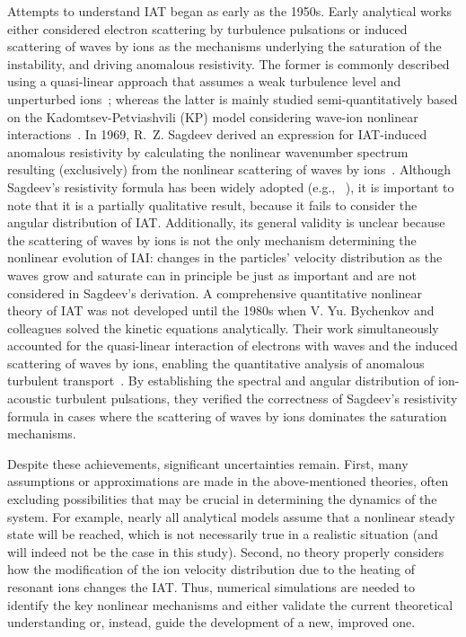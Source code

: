 \documentclass[%
 reprint,
 amsmath,
 amssymb,
 aps,
 prx,
floatfix,
superscriptaddress
]{revtex4-2}
\begin{document}
Attempts to understand IAT began as early as the 1950s.
Early analytical works either considered electron scattering by turbulence pulsations or induced scattering of waves by ions as the mechanisms underlying the saturation of the instability, and driving anomalous resistivity.
The former is commonly described using a quasi-linear approach that assumes a weak turbulence level and unperturbed ions~\cite{rudakov1966quasilinear,kovrizhnykh1966interaction, zavoiski1967turbulant}; whereas the latter is mainly studied semi-quantitatively based on the Kadomtsev-Petviashvili (KP) model considering wave-ion nonlinear interactions~\cite{kadomtsev1962turbulence,petviashvili1963ion}.
In 1969, R.~Z. Sagdeev derived an expression for IAT-induced anomalous resistivity by calculating the nonlinear wavenumber spectrum resulting (exclusively) from the nonlinear scattering of waves by ions~\cite{Sagdeev1967, sagdeev1969nonlinear}. 
Although Sagdeev's resistivity formula has been widely adopted (e.g., ~\cite{uzdensky2003petschek}), it is important to note that it is a partially qualitative result, because it fails to consider the angular distribution of IAT.
Additionally, its general validity is unclear because the scattering of waves by ions is not the only mechanism determining the nonlinear evolution of IAI:
changes in the particles' velocity distribution as the waves grow and saturate can in principle be just as important and are not considered in Sagdeev's derivation.
A comprehensive quantitative nonlinear theory of IAT was not developed until the 1980s when V. Yu. Bychenkov and colleagues solved the kinetic equations analytically. 
Their work simultaneously accounted for the quasi-linear interaction of electrons with waves and the induced scattering of waves by ions, enabling the quantitative analysis of anomalous turbulent transport~\cite{bychenkov1981angular, bychenkov1982ion, bychenkov1982transfer, bychenkov1984transport}. 
By establishing the spectral and angular distribution of ion-acoustic turbulent pulsations, they verified the correctness of Sagdeev's resistivity formula in cases where the scattering of waves by ions dominates the saturation mechanisms.

Despite these achievements, significant uncertainties remain.
First, many assumptions or approximations are made in the above-mentioned theories, often excluding possibilities that may be crucial in determining the dynamics of the system. 
For example, nearly all analytical models assume that a nonlinear steady state will be reached, which is not necessarily true in a realistic situation (and will indeed not be the case in this study).
Second, no theory properly considers how the modification of the ion velocity distribution due to the heating of resonant ions changes the IAT. Thus, numerical simulations are needed to identify the key nonlinear mechanisms and either validate the current theoretical understanding or, instead, guide the development of a new, improved one.
\end{document}
